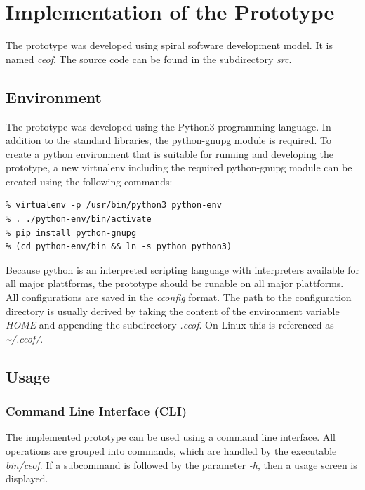 \chapter{Implementation of the Prototype}
The prototype was developed using spiral software development model.
It is named \textit{ceof}. The source code can be found in the subdirectory
\textit{src}.
\section{Environment}
The prototype was developed using the Python3 programming language.
In addition to the standard libraries, the python-gnupg module is required.
To create a python environment that is suitable for running and developing
the prototype, a new virtualenv including the required python-gnupg module
can be created using the following commands:
\begin{verbatim}
% virtualenv -p /usr/bin/python3 python-env
% . ./python-env/bin/activate
% pip install python-gnupg
% (cd python-env/bin && ln -s python python3)
\end{verbatim}
Because python is an interpreted scripting language with interpreters
available for all major plattforms, the prototype should be runable
on all major plattforms.
All configurations are saved in the \textit{cconfig}\cite{cconfig} format.
The path to the configuration directory is usually derived by taking
the content of the environment variable \textit{HOME} and appending
the subdirectory \textit{.ceof}. On Linux this is referenced as
\textit{\textasciitilde{}/.ceof/}.
\section{Usage}
\subsection{Command Line Interface (CLI)}
The implemented prototype can be used using a command line interface.
All operations are grouped into commands, which are handled by the
executable \textit{bin/ceof}. If a subcommand is followed by the parameter
\textit{-h}, then a usage screen is displayed.
